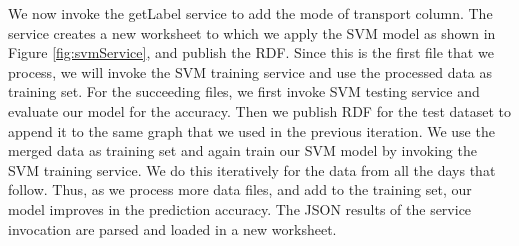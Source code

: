 We now invoke the getLabel service to add the mode of transport column. The service creates a new worksheet to which we apply the SVM model as shown in Figure \ref{fig:svmService}, and publish the RDF. Since this is the first file that we process, we will invoke the SVM training service and use the processed data as training set. For the succeeding files, we first invoke SVM testing service and evaluate our model for the accuracy. Then we publish RDF for the test dataset to append it to the same graph that we used in the previous iteration. We use the merged data as training set and again train our SVM model by invoking the SVM training service. We do this iteratively for the data from all the days that follow. Thus, as we process more data files, and add to the training set, our model improves in the prediction accuracy. The JSON results of the service invocation are parsed and loaded in a new worksheet. 

